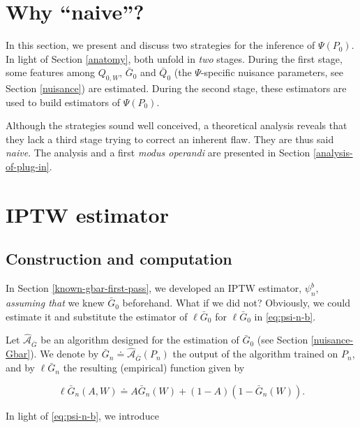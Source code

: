 \documentclass[
  11pt,
  openright,twoside]{book}
\newcommand{\Algo}{\widehat{\mathcal{A}}}
\newcommand{\defq}{\doteq}
\newcommand{\Gbar}{\bar{G}}
\newcommand{\Qbar}{\bar{Q}}
\theoremstyle{definition}
\theoremstyle{definition}
\theoremstyle{definition}
\theoremstyle{definition}
\theoremstyle{remark}
\begin{document}
\hypertarget{why-naive}{%
\section{Why ``naive''?}\label{why-naive}}

In this section, we present and discuss two strategies for the inference of
\(\Psi(P_{0})\). In light of Section \ref{anatomy}, both unfold in \emph{two}
stages. During the first stage, some features among \(Q_{0,W}\), \(\Gbar_{0}\)
and \(\Qbar_{0}\) (the \(\Psi\)-specific nuisance parameters, see Section
\ref{nuisance}) are estimated. During the second
stage, these estimators are used to build estimators of \(\Psi(P_{0})\).

Although the strategies sound well conceived, a theoretical analysis reveals
that they lack a third stage trying to correct an inherent flaw. They are thus
said \emph{naive}. The analysis and a first \emph{modus operandi} are presented in
Section \ref{analysis-of-plug-in}.

\hypertarget{known-gbar-second-pass}{%
\section{IPTW estimator}\label{known-gbar-second-pass}}

\hypertarget{unknown-gbar-constr}{%
\subsection{Construction and computation}\label{unknown-gbar-constr}}

In Section \ref{known-gbar-first-pass}, we developed an IPTW estimator,
\(\psi_{n}^{b}\), \emph{assuming that} we knew \(\Gbar_{0}\) beforehand. What if we
did not? Obviously, we could estimate it and substitute the estimator of
\(\ell\Gbar_{0}\) for \(\ell\Gbar_{0}\) in \eqref{eq:psi-n-b}.

Let \(\Algo_{\Gbar}\) be an algorithm designed for the estimation of \(\Gbar_{0}\)
(see Section \ref{nuisance-Gbar}). We denote by \(\Gbar_{n} \defq \Algo_{\Gbar}(P_{n})\) the output of the algorithm trained on \(P_{n}\), and by
\(\ell\Gbar_{n}\) the resulting (empirical) function given by

\begin{equation*}
\ell\Gbar_{n}(A,W) \defq A \Gbar_{n}(W) + (1-A) (1 - \Gbar_{n}(W)).
\end{equation*}

In light of \eqref{eq:psi-n-b}, we introduce
\end{document}

